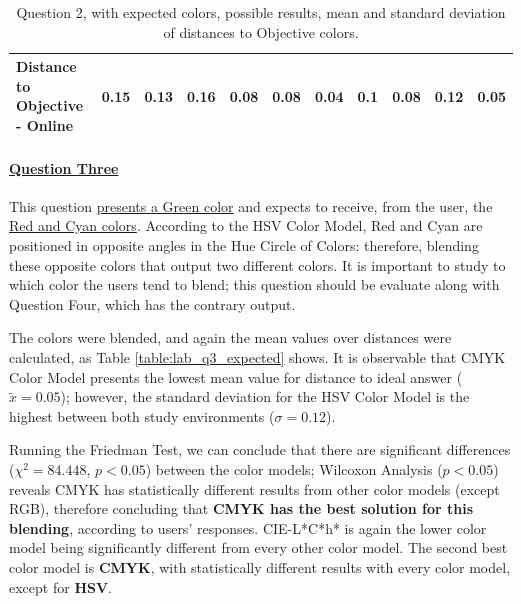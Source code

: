 \begin{table}[H]
{\begin{tabular}{lccccccccccccc}
    \multicolumn{4}{l}{Distance to Objective - Online}                                                                                               & \multicolumn{1}{|c}{0.15}       & \multicolumn{1}{c|}{0.13}    & \multicolumn{1}{|c}{0.16}       & \multicolumn{1}{c|}{0.08}    & \multicolumn{1}{|c}{\textbf{0.08}}       & \multicolumn{1}{c|}{0.04}    & \multicolumn{1}{|c}{0.1}        & \multicolumn{1}{c|}{0.08}    & \multicolumn{1}{|c}{0.12}       & \multicolumn{1}{c|}{0.05}    \\ \hline
    \end{tabular}}
  \caption[Question 2, with expected Results.]{Question 2, with expected colors, possible results, mean and standard deviation of distances to Objective colors.}
  \label{table:lab_q2_expected}
\end{table}
%
%
\paragraph{\ul{Question Three}}
%
This question \ul{presents a Green color} and expects to receive, from the user, the \ul{Red and Cyan colors}. According to the HSV Color Model, Red and Cyan are positioned in
opposite angles in the Hue Circle of Colors: therefore, blending these opposite colors that output two different colors. It is important to study to which color the users tend
to blend; this question should be evaluate along with Question Four, which has the contrary output. \par
%
The colors were blended, and again the mean values over distances were calculated, as Table \ref{table:lab_q3_expected} shows. It is observable that CMYK Color Model presents
the lowest mean value for distance to ideal answer ($\tilde{x} = 0.05$); however, the standard deviation for the HSV Color Model is the highest between both study environments ($\sigma = 0.12$). \par
%
Running the Friedman Test, we can conclude that there are significant differences ($\chi^2 = 84.448$, $p < 0.05$) between the color models; Wilcoxon Analysis ($p < 0.05$) reveals
CMYK has statistically different results from other color models (except RGB), therefore concluding that \textbf{CMYK has the best solution for this blending}, according to
users' responses. CIE-L*C*h* is again the lower color model being significantly different from every other color model. The second best color model is \textbf{CMYK}, with
statistically different results with every color model, except for \textbf{HSV}. \par
